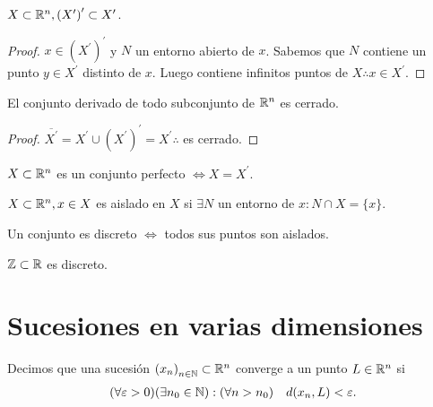 \begin{prop}
  \(X \subset \mathbb{R}^n, {(X^{\prime})}^{\prime} \subset X^{\prime} \).
  \begin{proof}
    \(x \in {(X^{\prime})}^{\prime} \) y \(N\) un entorno abierto de \(x\). Sabemos que \(N\) contiene un punto \(y \in X^{\prime} \) distinto de \(x\). Luego contiene infinitos puntos de \(X \therefore x \in X^{\prime} \).
  \end{proof}
\end{prop}

\begin{corollary}
  El conjunto derivado de todo subconjunto de \(\mathbb{R}^n\) es cerrado.
  \begin{proof}
    \(\overline{X^{\prime}} = X^{\prime} \cup {(X^{\prime})}^{\prime} = X^{\prime} \therefore \) es cerrado.
  \end{proof}
\end{corollary}

\begin{definition}
  \(X \subset \mathbb{R}^n\) es un conjunto perfecto \(\iff X = X^{\prime} \).
\end{definition}

\begin{definition}
  \(X \subset \mathbb{R}^n, x \in X\) es aislado en \(X\) si \(\exists N\) un entorno de \(x : N \cap X = \{x\} \).
\end{definition}

\begin{definition}
  Un conjunto es discreto \(\iff \) todos sus puntos son aislados.
\end{definition}

\begin{eg}
  \(\mathbb{Z} \subset \mathbb{R} \) es discreto.
\end{eg}

\section{Sucesiones en varias dimensiones}

Decimos que una sucesión \({(x_n)}_{n \in \mathbb{N}} \subset \mathbb{R}^n\) converge a un punto \(L \in \mathbb{R}^n\) si \begin{align*}
  (\forall \varepsilon > 0)(\exists n_0 \in \mathbb{N}) : (\forall n > n_0) \quad d(x_n, L) < \varepsilon.
\end{align*}


